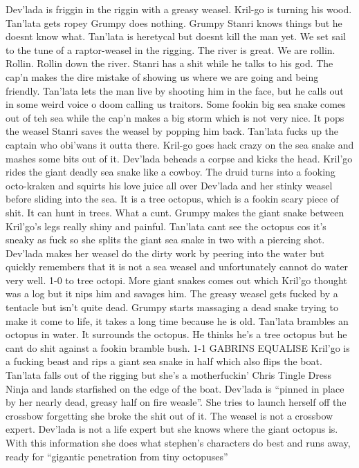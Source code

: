 Dev’lada is friggin in the riggin with a greasy weasel. Kril-go is turning his wood. Tan’lata gets ropey Grumpy does nothing. Grumpy Stanri knows things but he doesnt know what. Tan’lata is heretycal but doesnt kill the man yet.\medskip
We set sail to the tune of a raptor-weasel in the rigging. The river is great. We are rollin. Rollin. Rollin down the river.\medskip
Stanri has a shit while he talks to his god.\medskip
The cap’n makes the dire mistake of showing us where we are going and being friendly. Tan’lata lets the man live by shooting him in the face, but he calls out in some weird voice o doom calling us traitors.\medskip
Some fookin big sea snake comes out of teh sea while the cap’n makes a big storm which is not very nice. It pops the weasel\medskip
Stanri saves the weasel by popping him back. Tan’lata fucks up the captain who obi’wans it outta there. Kril-go goes hack crazy on the sea snake and mashes some bits out of it. Dev’lada beheads a corpse and kicks the head.\medskip
Kril’go rides the giant deadly sea snake like a cowboy. The druid turns into a fooking octo-kraken and squirts his love juice all over Dev’lada and her stinky weasel before sliding into the sea. It is a tree octopus, which is a fookin scary piece of shit. It can hunt in trees. What a cunt.\medskip
Grumpy makes the giant snake between Kril’go’s legs really shiny and painful. Tan’lata cant see the octopus cos it’s sneaky as fuck so she splits the giant sea snake in two with a piercing shot.\medskip
Dev’lada makes her weasel do the dirty work by peering into the water but quickly remembers that it is not a sea weasel and unfortunately cannot do water very well. 1-0 to tree octopi.\medskip
More giant snakes comes out which Kril’go thought was a log but it nips him and savages him. The greasy weasel gets fucked by a tentacle but isn’t quite dead.\medskip
Grumpy starts massaging a dead snake trying to make it come to life, it takes a long time because he is old.\medskip
Tan’lata brambles an octopus in water. It surrounds the octopus. He thinks he’s a tree octopus but he cant do shit against a fookin bramble bush. 1-1 GABRINS EQUALISE\medskip
Kril’go is a fucking beast and rips a giant sea snake in half which also flips the boat. Tan’lata falls out of the rigging but she’s a motherfuckin’ Chris Tingle Dress Ninja and lands starfished on the edge of the boat.\medskip
Dev’lada is “pinned in place by her nearly dead, greasy half on fire weasle”. She tries to launch herself off the crossbow forgetting she broke the shit out of it. The weasel is not a crossbow expert. Dev’lada is not a life expert but she knows where the giant octopus is. With this information she does what stephen’s characters do best and runs away, ready for “gigantic penetration from tiny octopuses”\medskip
